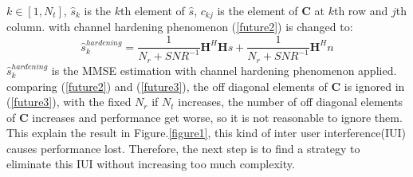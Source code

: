 \documentclass[12pt,a4paper,final]{article}
\begin{document}
\begin{spacing}{2.5}
\begin{equation}
\end{equation}
$k\in [1,N_{t}]$, $\hat{s}_{k}$ is the $k$th element of $\hat{s}$, $c_{kj}$ is the element of $\mathbf{C}$ at $k$th row and $j$th column.
with channel hardening phenomenon (\ref{future2}) is changed to:
\begin{equation}
\hat{s}_{k}^{hardening}=\frac{1}{N_{r}+SNR^{-1}}\mathbf{H}^{H}\mathbf{H}s+\frac{1}{N_{r}+SNR^{-1}}\mathbf{H}^{H}n\label{future3}
\end{equation}
$\hat{s}_{k}^{hardening}$ is the MMSE estimation with channel hardening phenomenon applied.
comparing (\ref{future2}) and (\ref{future3}), the off diagonal elements of $\mathbf{C}$ is ignored in (\ref{future3}), with the fixed $N_{r}$ if $N_{t}$ increases, the number of off diagonal elements of $\mathbf{C}$ increases and performance get worse, so it is not reasonable to ignore them. This explain the result in Figure.\ref{figure1}, this kind of inter user interference(IUI) causes performance lost. Therefore, the next step is to find a strategy to eliminate this IUI without increasing too much complexity.












%
%
%






\end{spacing}


\end{document}
